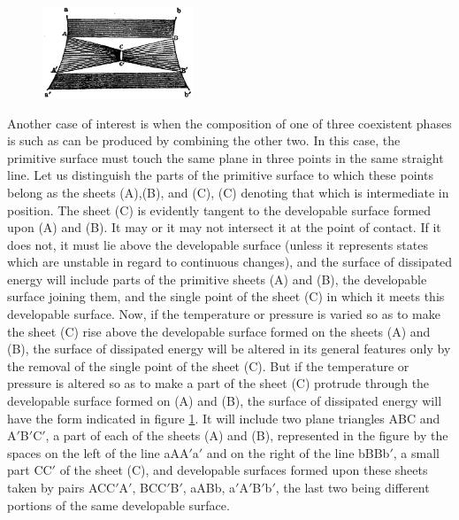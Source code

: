 \documentclass[12pt]{article}
\begin{document}
\begin{figure} %
    \centering
    \includegraphics[width=0.4\textwidth]{fig_8}
    \caption{ }
    \label{fig_8}
\end{figure}
Another case of interest is when the composition of one of three coexistent phases is such as can be produced by combining the other two. In this case, the primitive surface must touch the same plane in three points in the same straight line. Let us distinguish the parts of the primitive surface to which these points belong as the sheets (A),(B), and (C), (C) denoting that which is intermediate in position. The sheet (C) is evidently tangent to the developable surface formed upon (A) and (B). It may or it may not intersect it at the point of contact. If it does not, it must lie above the developable surface (unless it represents states which are unstable in regard to continuous changes), and the surface of dissipated energy will include parts of the primitive sheets (A) and (B), the developable surface joining them, and the single point of the sheet (C) in which it meets this developable surface. Now, if the temperature or pressure is varied so as to make the sheet (C) rise above the developable   surface formed on the sheets (A) and (B), the surface of dissipated energy will be altered in its general features only by the removal of the single point of the sheet (C). But if the temperature or pressure 
is altered so as to make a part of the sheet (C) protrude through the developable surface formed on (A) and (B), the surface of dissipated energy will have the form indicated in figure \ref{fig_8}. It will include two plane triangles ABC and A$'$B$'$C$'$, a part of each of the sheets (A) and (B), represented in the figure by the spaces on the left of the line aAA$'$a$'$ and on the right of the line bBBb$'$, a small part CC$'$ of the sheet (C), and developable surfaces formed upon these sheets taken by pairs ACC$'$A$'$, BCC$'$B$'$, aABb, a$'$A$'$B$'$b$'$, the last two being different portions of the same developable surface.
\end{document}
